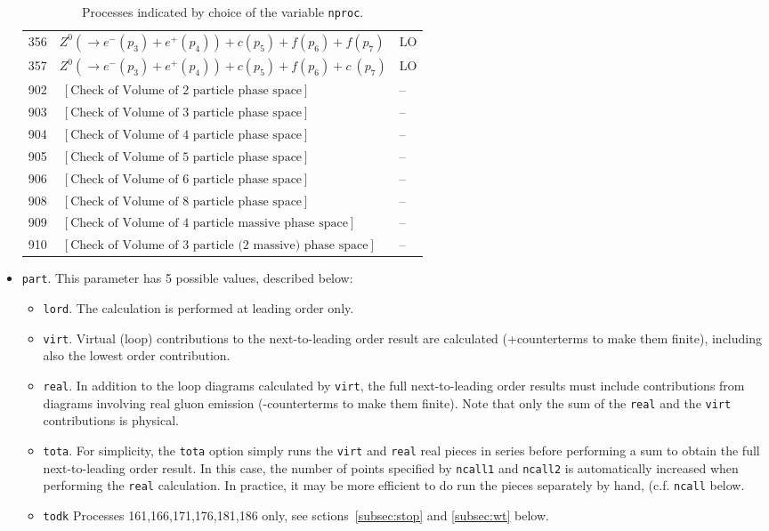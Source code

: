 \documentclass[12pt]{article}
\begin{document}
\begin{itemize}
\begin{table}
\begin{center}
\begin{tabular}{|l|l|l|}
356& $ Z^0(\to e^-(p_3)+e^+(p_4))+c(p_5)+f(p_6)+f(p_7)$ & LO \\
357& $ Z^0(\to e^-(p_3)+e^+(p_4))+c(p_5)+f(p_6)+c~(p_7)$ & LO \\
\hline 
902& $  ~[ \mbox{Check of Volume of 2 particle phase space} ] $ & -- \\
903& $  ~[ \mbox{Check of Volume of 3 particle phase space} ] $ & -- \\
904& $  ~[ \mbox{Check of Volume of 4 particle phase space} ] $ & -- \\
905& $  ~[ \mbox{Check of Volume of 5 particle phase space} ] $ & -- \\
906& $  ~[ \mbox{Check of Volume of 6 particle phase space} ] $ & -- \\
908& $  ~[ \mbox{Check of Volume of 8 particle phase space} ] $ & -- \\
909& $  ~[ \mbox{Check of Volume of 4 particle massive phase space} ] $ & -- \\
910& $  ~[ \mbox{Check of Volume of 3 particle (2 massive) phase space} ] $ & -- \\


\hline
\end{tabular}
\end{center}
\caption{Processes indicated by choice of the variable {\tt nproc}.\label{nproctable}}

\end{table}

\item {\tt part}.
This parameter has 5 possible values, described below:
\begin{itemize}
\item {\tt lord}.
The calculation is performed at leading order only.
\item {\tt virt}.
Virtual (loop) contributions to the next-to-leading order result are
calculated (+counterterms to make them finite), including also the
lowest order contribution.
\item {\tt real}.
In addition to the loop diagrams calculated by {\tt virt}, the full
next-to-leading order results must include contributions from diagrams
involving real gluon emission (-counterterms to make them finite).
Note that only the sum of the {\tt real} and the {\tt virt} contributions
is physical.
\item {\tt tota}.
For simplicity, the {\tt tota} option simply runs the {\tt virt} and
{\tt real} real pieces in series before performing a sum to obtain
the full next-to-leading order result. In this case, the number of
points specified by {\tt ncall1} and {\tt ncall2} is automatically
increased when performing the {\tt real} calculation. In practice,
it may be more efficient to do run the pieces separately by hand, 
(c.f. {\tt ncall} below.
\item {\tt todk}
Processes 161,166,171,176,181,186 only, see sctions~\ref{subsec:stop} and
\ref{subsec:wt} below.
\end{itemize}


\end{itemize}
\end{document}
